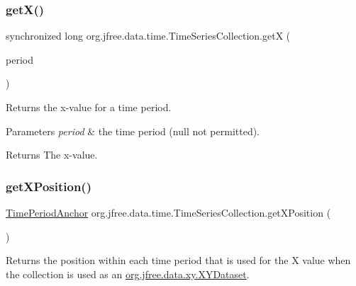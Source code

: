 \subsubsection{\texorpdfstring{get\+X()}{getX()}\hspace{0.1cm}{\footnotesize\ttfamily [2/2]}}
{\footnotesize\ttfamily synchronized long org.\+jfree.\+data.\+time.\+Time\+Series\+Collection.\+getX (\begin{DoxyParamCaption}\item[{\mbox{\hyperlink{classorg_1_1jfree_1_1data_1_1time_1_1_regular_time_period}{Regular\+Time\+Period}}}]{period }\end{DoxyParamCaption})\hspace{0.3cm}{\ttfamily [protected]}}

Returns the x-\/value for a time period.


\begin{DoxyParams}{Parameters}
{\em period} & the time period ({\ttfamily null} not permitted).\\
\hline
\end{DoxyParams}
\begin{DoxyReturn}{Returns}
The x-\/value. 
\end{DoxyReturn}
\mbox{\label{classorg_1_1jfree_1_1data_1_1time_1_1_time_series_collection_a4c3b131735a639e58c104975adae7425}} 
\subsubsection{\texorpdfstring{get\+X\+Position()}{getXPosition()}}
{\footnotesize\ttfamily \mbox{\hyperlink{classorg_1_1jfree_1_1data_1_1time_1_1_time_period_anchor}{Time\+Period\+Anchor}} org.\+jfree.\+data.\+time.\+Time\+Series\+Collection.\+get\+X\+Position (\begin{DoxyParamCaption}{ }\end{DoxyParamCaption})}

Returns the position within each time period that is used for the X value when the collection is used as an \mbox{\hyperlink{interfaceorg_1_1jfree_1_1data_1_1xy_1_1_x_y_dataset}{org.\+jfree.\+data.\+xy.\+X\+Y\+Dataset}}.

